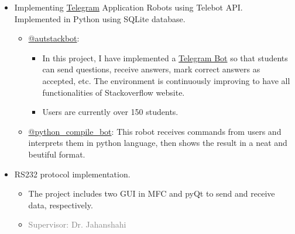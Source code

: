 \begin{itemize}
		\item Implementing \href{https://telegram.org/}{Telegram} Application Robots using Telebot API.\\
		Implemented in Python using SQLite database.
		\begin{itemize}
			\item \href{https://telegram.me/autstackbot}{@autstackbot}:
			\begin{itemize}
				\item In this project, I have implemented a \href{https://telegram.org/blog/bot-revolution}{Telegram Bot} so that students can send questions, receive answers, mark correct answers as accepted, etc. The environment is continuously improving to have all functionalities of Stackoverflow website.
				\item Users are currently over 150 students.
			\end{itemize}
			\item \href{https://telegram.me/python_compile_bot}{@python\_compile\_bot}: This robot receives commands from users and interprets them in python language, then shows the result in a neat and beutiful format.
		\end{itemize}
		
		\item RS232 protocol implementation.
		\begin{itemize}
			\item The project includes two GUI in MFC and pyQt to send and receive data, respectively. 
			\item \textcolor{gray}{Supervisor: Dr. Jahanshahi}
		\end{itemize}
	
	
	\end{itemize}




